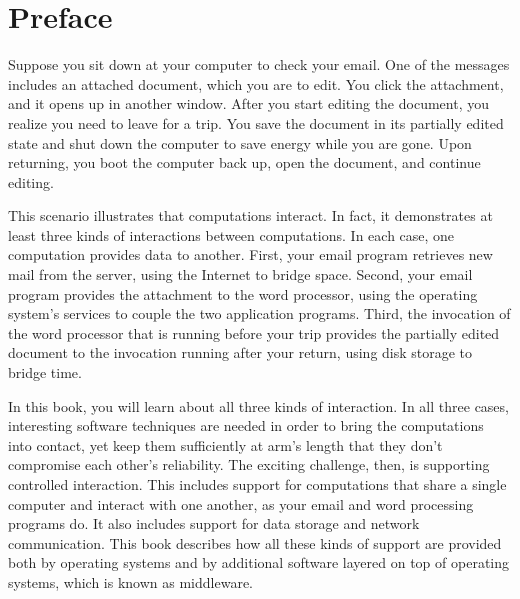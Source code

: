 \chapter*{Preface}

Suppose you
sit down at your computer to check your email. One of the messages
includes an attached document, which you are to edit.  You click
the attachment, and it opens up in another window.  After you start
editing the document, you realize you need to leave for a trip.  You
save the document in its partially edited state and shut down the
computer to save energy while you are gone.  Upon returning, you boot
the computer back up, open the document, and continue editing.

This scenario illustrates that computations interact.  In fact, it demonstrates at least three kinds of interactions
between computations.  In each case, one computation provides data to
another.  First, your email program retrieves new mail from the
server, using the Internet to bridge space.  Second, your email
program provides the attachment to the word processor, using the
operating system's services to couple the two application programs.
Third, the invocation of the
word processor that is running before your trip provides the partially edited
document to the invocation running after your return, using disk
storage to bridge time.

In this book, you will learn about all three kinds of interaction.  In
all three cases, interesting software techniques are needed in order
to bring the computations into contact, yet keep them sufficiently at
arm's length that they don't compromise each other's reliability.
The exciting challenge, then, is supporting controlled interaction.
This includes support for computations that share a single computer
and interact with one another, as your email and word processing
programs do.  It also includes support for data storage and network
communication.  This book describes how all these kinds of support are
provided both by operating systems and by additional software layered
on top of operating systems, which is known as middleware.

